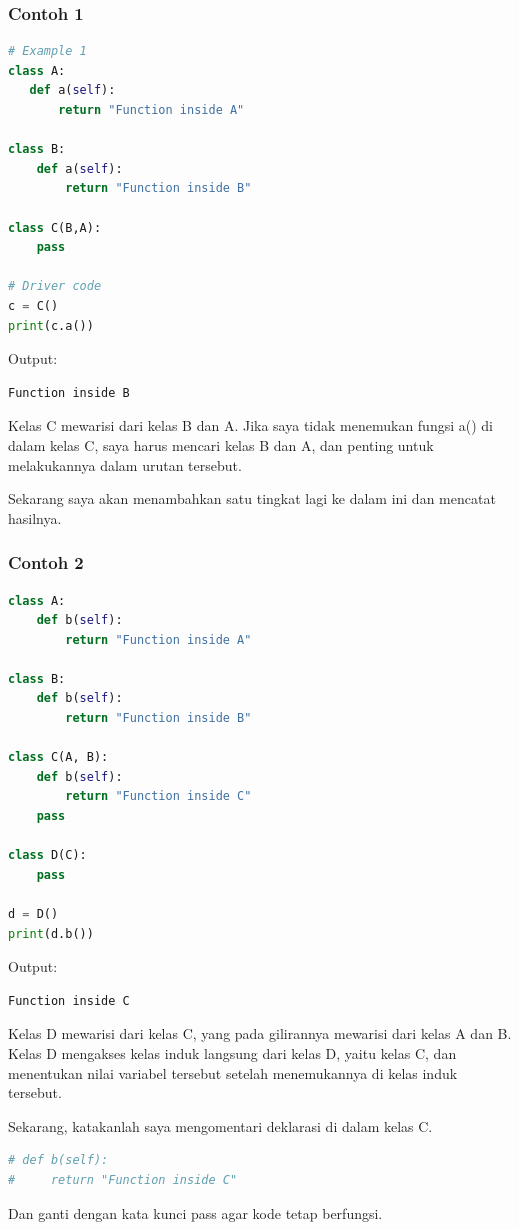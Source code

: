 \documentclass{article}
\begin{document}
\subsubsection{Contoh 1}
\begin{lstlisting}[language=Python, caption={}, captionpos=b]
# Example 1
class A:
   def a(self):
       return "Function inside A"

class B:
    def a(self):
        return "Function inside B"

class C(B,A):
    pass

# Driver code
c = C()
print(c.a())
\end{lstlisting}
Output:
\begin{lstlisting}[language=Python, caption={}, captionpos=b]
Function inside B
\end{lstlisting}

Kelas C mewarisi dari kelas B dan A. Jika saya tidak menemukan fungsi a() di dalam kelas C, saya harus mencari kelas B dan A, dan penting untuk melakukannya dalam urutan tersebut.

Sekarang saya akan menambahkan satu tingkat lagi ke dalam ini dan mencatat hasilnya.

\subsubsection{Contoh 2}
\begin{lstlisting}[language=Python, caption={}, captionpos=b]
class A:
    def b(self):
        return "Function inside A"

class B:
    def b(self):
        return "Function inside B"

class C(A, B):
    def b(self):
        return "Function inside C"
    pass

class D(C):
    pass

d = D()
print(d.b())
\end{lstlisting}
Output:
\begin{lstlisting}[language=Python, caption={}, captionpos=b]
Function inside C
\end{lstlisting}
Kelas D mewarisi dari kelas C, yang pada gilirannya mewarisi dari kelas A dan B. Kelas D mengakses kelas induk langsung dari kelas D, yaitu kelas C, dan menentukan nilai variabel tersebut setelah menemukannya di kelas induk tersebut.

Sekarang, katakanlah saya mengomentari deklarasi di dalam kelas C.
\begin{lstlisting}[language=Python, caption={}, captionpos=b]
# def b(self):
#     return "Function inside C" 
\end{lstlisting}
Dan ganti dengan kata kunci pass agar kode tetap berfungsi.
\end{document}

